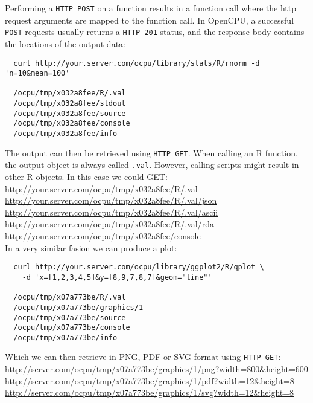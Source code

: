 \documentclass{scrartcl}\usepackage[]{graphicx}\usepackage[]{color}
\begin{document}
\noindent Performing a \texttt{HTTP POST} on a function results in a function call where the http request arguments are mapped to the function call. In OpenCPU, a successful \texttt{POST} requests usually returns a \texttt{HTTP 201} status, and the response body contains the locations of the output data:

\begin{verbatim}
  curl http://your.server.com/ocpu/library/stats/R/rnorm -d 'n=10&mean=100'
  
  /ocpu/tmp/x032a8fee/R/.val
  /ocpu/tmp/x032a8fee/stdout
  /ocpu/tmp/x032a8fee/source
  /ocpu/tmp/x032a8fee/console
  /ocpu/tmp/x032a8fee/info
\end{verbatim}
The output can then be retrieved using \texttt{HTTP GET}. When calling an R function, the output object is always called \texttt{.val}. However, calling scripts might result in other R objects. In this case we could GET: \\

\indent \url{http://your.server.com/ocpu/tmp/x032a8fee/R/.val} \\
\indent \url{http://your.server.com/ocpu/tmp/x032a8fee/R/.val/json} \\
\indent \url{http://your.server.com/ocpu/tmp/x032a8fee/R/.val/ascii} \\
\indent \url{http://your.server.com/ocpu/tmp/x032a8fee/R/.val/rda} \\
\indent \url{http://your.server.com/ocpu/tmp/x032a8fee/console} \\

\noindent In a very similar fasion we can produce a plot:

\begin{verbatim}
  curl http://your.server.com/ocpu/library/ggplot2/R/qplot \
    -d 'x=[1,2,3,4,5]&y=[8,9,7,8,7]&geom="line"'
  
  /ocpu/tmp/x07a773be/R/.val
  /ocpu/tmp/x07a773be/graphics/1
  /ocpu/tmp/x07a773be/source
  /ocpu/tmp/x07a773be/console
  /ocpu/tmp/x07a773be/info  
\end{verbatim}
Which we can then retrieve in PNG, PDF or SVG format using \texttt{HTTP GET}: \\

\indent \url{http://server.com/ocpu/tmp/x07a773be/graphics/1/png?width=800&height=600} \\
\indent \url{http://server.com/ocpu/tmp/x07a773be/graphics/1/pdf?width=12&height=8} \\
\indent \url{http://server.com/ocpu/tmp/x07a773be/graphics/1/svg?width=12&height=8} \\
\end{document}

